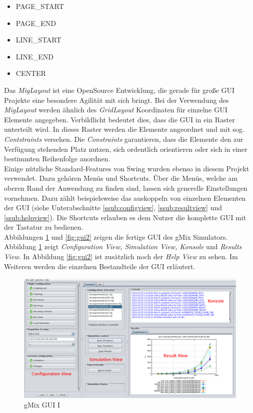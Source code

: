 \documentclass[a4paper, 11pt]{article} %
\begin{document}
\begin{itemize}
    \item {PAGE\_START}
    \item {PAGE\_END}
    \item {LINE\_START}
    \item {LINE\_END}
    \item {CENTER}
\end{itemize}

Das \emph{MigLayout} ist eine OpenSource Entwicklung, die gerade für große GUI Projekte eine besondere Agilität mit sich bringt. Bei der Verwendung des \emph{MigLayout} werden ähnlich des \emph{GridLayout} Koordinaten für einzelne GUI Elemente angegeben. Verbildlicht bedeutet dies, dass die GUI in ein Raster unterteilt wird. In dieses Raster werden die Elemente angeordnet und mit sog. \emph{Contstraints} versehen. Die \emph{Constraints} garantieren, dass die Elemente den zur Verfügung stehenden Platz nutzen, sich ordentlich orientieren oder sich in einer bestimmten Reihenfolge anordnen. \\

Einige nützliche Standard-Features von Swing wurden ebenso in diesem Projekt verwendet. Dazu gehören Menüs und Shortcuts. Über die Menüs, welche am oberen Rand der Anwendung zu finden sind, lassen sich generelle Einstellungen vornehmen. Dazu zählt beispielsweise das auskoppeln von einzelnen Elementen der GUI (siehe Unterabschnitte \ref{ssub:configview}, \ref{ssub:resultview} und \ref{ssub:helpview}). Die Shortcuts erlauben es dem Nutzer die komplette GUI mit der Tastatur zu bedienen. \\

Abbildungen \ref{fig:gui1} und \ref{fig:gui2} zeigen die fertige GUI des gMix Simulators. Abbildung \ref{fig:gui1} zeigt \emph{Configuration View, Simulation View, Konsole} und \emph{Results View}. In Abbildung \ref{fig:gui2} ist zusätzlich noch der \emph{Help View} zu sehen. Im Weiteren werden die einzelnen Bestandteile der GUI erläutert.

\begin{figure}[!htp]
\includegraphics[width=\textwidth]{img/gmixGuiSimulator}
\caption{gMix GUI I}
\label{fig:gui1}
\end{figure}
\end{document}
